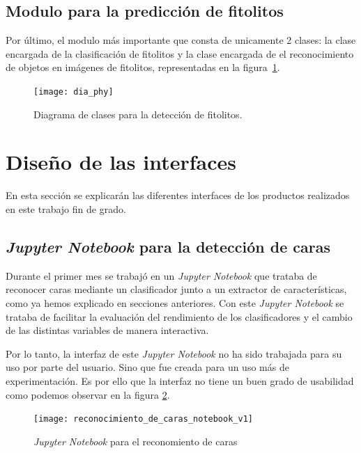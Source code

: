 \subsection{Modulo para la predicción de fitolitos}

Por último, el modulo más importante que consta de unicamente 2 clases: la clase encargada de la clasificación de fitolitos y la clase encargada de el reconocimiento de objetos en imágenes de fitolitos, representadas en la figura~\ref{fig:C.4.7}.

\begin{figure}
\centering
\texttt{[image: dia\_phy]}
\caption{Diagrama de clases para la detección de fitolitos.}
\label{fig:C.4.7}
\end{figure}

\section{Diseño de las interfaces}

En esta sección se explicarán las diferentes interfaces de los productos realizados en este trabajo fin de grado.

\subsection{\textit{Jupyter Notebook} para la detección de caras}

Durante el primer mes se trabajó en un \textit{Jupyter Notebook} que trataba de reconocer caras mediante un clasificador junto a un extractor de características, como ya hemos explicado en secciones anteriores. Con este \textit{Jupyter Notebook} se trataba de facilitar la evaluación del rendimiento de los clasificadores y el cambio de las distintas variables de manera interactiva. 

Por lo tanto, la interfaz de este \textit{Jupyter Notebook} no ha sido trabajada para su uso por parte del usuario. Sino que fue creada para un uso más de experimentación. Es por ello que la interfaz no tiene un buen grado de usabilidad como podemos observar en la figura \ref{fig:C.5.1}.

\begin{figure}
\centering
\texttt{[image: reconocimiento\_de\_caras\_notebook\_v1]}
\caption{\textit{Jupyter Notebook} para el reconomiento de caras}
\label{fig:C.5.1}
\end{figure}

